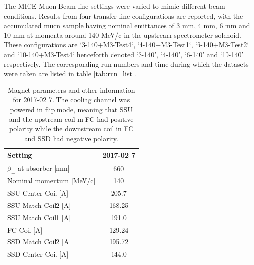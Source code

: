 The MICE Muon Beam line settings were varied to mimic different beam conditions. 
Results from four transfer line configurations are reported, with the 
accumulated muon sample having nominal emittances of 3 mm, 4 mm, 6 mm  and 10 mm 
at momenta around 140 MeV/c in the upstream spectrometer solenoid. These 
configurations are `3-140+M3-Test4`, `4-140+M3-Test1`, `6-140+M3-Test2` and `10-140+M3-Test4`
henceforth denoted `3-140', `4-140', `6-140' and `10-140' respectively. The 
corresponding run numbers and time during which the datasets were taken are 
listed in table \ref{tab:run_list}.

\begin{table}
\centering
\caption{Magnet parameters and other information for 2017-02 7. The cooling 
channel was powered in flip mode, meaning that SSU and the upstream coil in FC 
had positive polarity while the downstream coil in FC and SSD had negative 
polarity.
\label{tab:magnet_parameters}}
\begin{tabular}{|l|c|}
\hline
Setting                        & 2017-02 7    \\
\hline
$\beta_\perp$ at absorber [mm] & 660          \\
Nominal momentum [MeV/c]       & 140          \\
\hline
SSU Center Coil [A]            & 205.7        \\
SSU Match Coil2 [A]            & 168.25       \\
SSU Match Coil1 [A]            & 191.0        \\
\hline
FC Coil [A]                    & 129.24       \\
\hline
SSD Match Coil2 [A]            & 195.72       \\
SSD Center Coil [A]            & 144.0        \\
\hline
\end{tabular}
\end{table}

